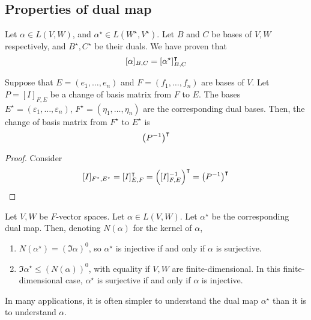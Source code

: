 \subsection{Properties of dual map}
Let \( \alpha \in L(V,W) \), and \( \alpha^\star \in L(W^\star, V^\star) \).
Let \( B \) and \( C \) be bases of \( V, W \) respectively, and \( B^\star, C^\star \) be their duals.
We have proven that
\[
	[\alpha]_{B,C} = [\alpha^\star]^\intercal_{B,C}
\]
\begin{lemma}
	Suppose that \( E = (e_1, \dots, e_n) \) and \( F = (f_1, \dots, f_n) \) are bases of \( V \).
	Let \( P = [I]_{F, E} \) be a change of basis matrix from \( F \) to \( E \).
	The bases \( E^\star = (\varepsilon_1, \dots, \varepsilon_n) \), \( F^\star = (\eta_1, \dots, \eta_n) \) are the corresponding dual bases.
	Then, the change of basis matrix from \( F^\star \) to \( E^\star \) is
	\[
		\qty(P^{-1})^\intercal
	\]
\end{lemma}
\begin{proof}
	Consider
	\[
		[I]_{F^\star, E^\star} = [I]^\intercal_{E, F} = \qty([I]_{F, E}^{-1})^\intercal = \qty(P^{-1})^\intercal
	\]
\end{proof}
\begin{lemma}
	Let \( V, W \) be \( F \)-vector spaces.
	Let \( \alpha \in L(V, W) \).
	Let \( \alpha^\star \) be the corresponding dual map.
	Then, denoting \( N(\alpha) \) for the kernel of \( \alpha \),
	\begin{enumerate}
		\item \( N(\alpha^\star) = (\Im \alpha)^0 \), so \( \alpha^\star \) is injective if and only if \( \alpha \) is surjective.
		\item \( \Im \alpha^\star \leq (N(\alpha))^0 \), with equality if \( V, W \) are finite-dimensional.
		      In this finite-dimensional case, \( \alpha^\star \) is surjective if and only if \( \alpha \) is injective.
	\end{enumerate}
\end{lemma}
\begin{remark}
	In many applications, it is often simpler to understand the dual map \( \alpha^\star \) than it is to understand \( \alpha \).
\end{remark}
